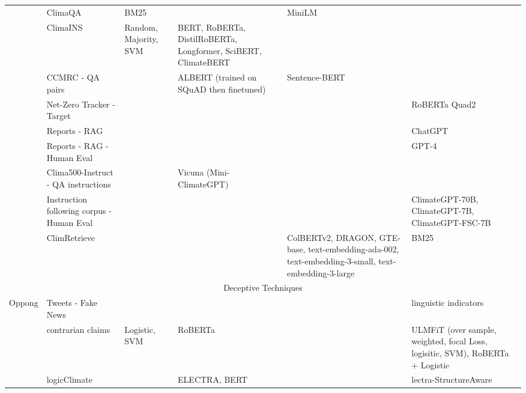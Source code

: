 \begin{longtable}[c]{lp{3cm}p{1.5cm}p{3cm}p{1.5cm}p{3cm}}
    \citet{spokoyny2023answering} & \raggedright ClimaQA &  BM25 &  & MiniLM &  \\

    \citet{spokoyny2023answering} & \raggedright ClimaINS & Random, Majority, SVM & BERT, RoBERTa, DistilRoBERTa, Longformer, SciBERT, ClimateBERT &  &  \\

    \citet{cliamtebot_2022} & \raggedright CCMRC - QA pairs &  &  ALBERT (trained on SQuAD then finetuned) & Sentence-BERT &  \\

    \citet{tobias_schimanski_climatebert-netzero_2023} & \raggedright Net-Zero Tracker - Target &  &  &  & RoBERTa  Quad2 \\

    \citet{jingwei_ni_paradigm_2023} & \raggedright Reports - RAG &  &  &  & ChatGPT \\

    \citet{s_vaghefi_chatclimate_2023} & \raggedright Reports - RAG - Human Eval &  &  &  & GPT-4 \\

    \citet{mullappilly-etal-2023-arabic} & \raggedright Clima500-Instruct - QA instructions &   & Vicuna (Mini-ClimateGPT) &  &  \\

    \citet{thulke2024climategpt} & \raggedright Instruction following corpus - Human Eval &   & & & ClimateGPT-70B, ClimateGPT-7B, ClimateGPT-FSC-7B \\

    \citet{thulke2024climategpt} & \raggedright ClimRetrieve &   & & {\tiny ColBERTv2, DRAGON, GTE-base, text-embedding-ada-002, text-embedding-3-small, text-embedding-3-large} & BM25 \\

    \multicolumn{6}{c}{Deceptive Techniques} \\
\midrule
    Oppong \cite{divinus_oppong-tawiah_corporate_2023} & \raggedright Tweets - Fake News &   &  &  & linguistic indicators \\

    \citet{coanComputerassistedClassificationContrarian2021} & \raggedright contrarian claims &  Logistic, SVM & RoBERTa &  & ULMFiT (over sample, weighted, focal Loss, logisitic, SVM), RoBERTa + Logistic \\

    \citet{jin-etal-2022-logical} & \raggedright logicClimate &   & ELECTRA, BERT &  & lectra-StructureAware \\


\end{longtable}
